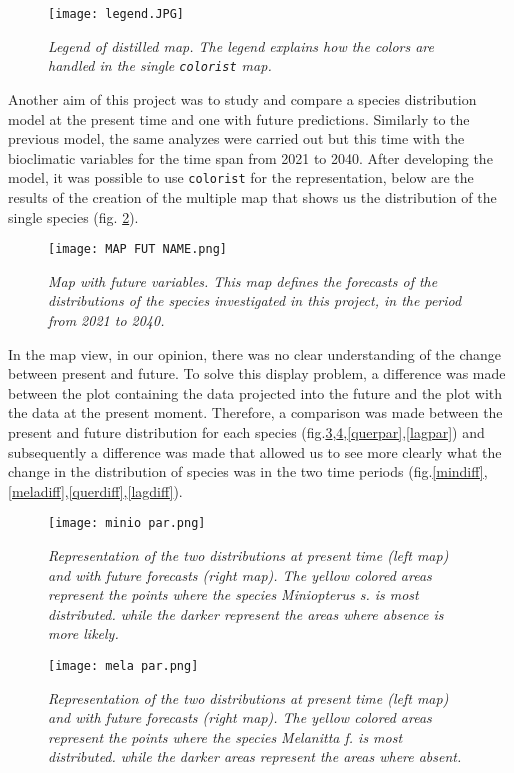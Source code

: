\documentclass[12pt,a4paper]{article}
\begin{document}
\begin{figure}[H]
\centerline{\texttt{[image: legend.JPG]}}
\caption{\textit{Legend of distilled map. The legend explains how the colors are handled in the single \texttt{colorist} map.}}
\label{legend}
\end{figure}
\vspace{1cm}
Another aim of this project was to study and compare a species distribution model at the present time and one with future predictions.
Similarly to the previous model, the same analyzes were carried out but this time with the bioclimatic variables for the time span from 2021 to 2040.
After developing the model, it was possible to use \texttt{colorist} for the representation, below are the results of the creation of the multiple map that shows us the distribution of the single species (fig. \ref{fut}).
\vspace{1cm}
\begin{figure}[H]
\centerline{\texttt{[image: MAP FUT NAME.png]}}
\caption{\textit{Map with future variables. This map defines the forecasts of the distributions of the species investigated in this project, in the period from 2021 to 2040.}}
\label{fut}
\end{figure}
In the map view, in our opinion, there was no clear understanding of the change between present and future.
To solve this display problem, a difference was made between the plot containing the data projected into the future and the plot with the data at the present moment.
Therefore, a comparison was made between the present and future distribution for each species (fig.\ref{miniopar},\ref{melapar},\ref{querpar},\ref{lagpar}) and subsequently a difference was made that allowed us to see more clearly what the change in the distribution of species was in the two time periods (fig.\ref{mindiff},\ref{meladiff},\ref{querdiff},\ref{lagdiff}).

\begin{figure}[H]
\centerline{\texttt{[image: minio par.png]}}
\caption{\textit{Representation of the two distributions at present time (left map) and with future forecasts (right map).
The yellow colored areas represent the points where the species Miniopterus s. is most distributed. while the darker represent the areas where absence is more likely.}}
\label{miniopar}
\end{figure}

\begin{figure}[H]
\centerline{\texttt{[image: mela par.png]}}
\caption{\textit{Representation of the two distributions at present time (left map) and with future forecasts (right map).
The yellow colored areas represent the points where the species Melanitta f. is most distributed. while the darker areas represent the areas where absent.}}
\label{melapar}
\end{figure}
\end{document}

